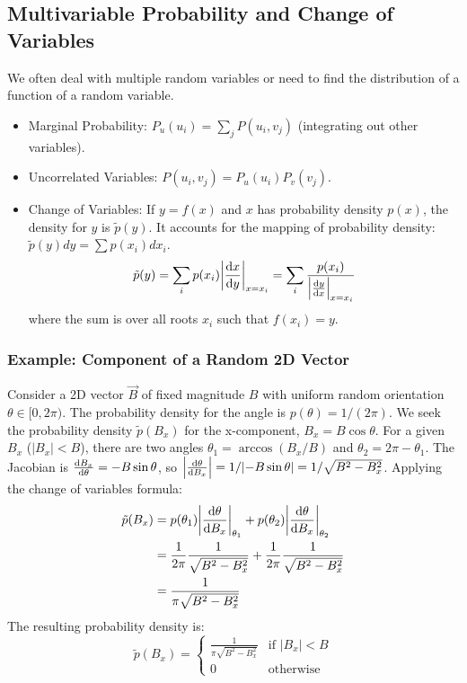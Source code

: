 \documentclass[10pt, letterpaper]{article}
\begin{document}
\subsection{Multivariable Probability and Change of Variables}
We often deal with multiple random variables or need to find the distribution of a function of a random variable.
\begin{itemize}
    \item Marginal Probability: $P_u(u_i) = \sum_j P(u_i, v_j)$ (integrating out other variables).
    \item Uncorrelated Variables: $P(u_i, v_j) = P_u(u_i) P_v(v_j)$.
    \item Change of Variables: If $y = f(x)$ and $x$ has probability density $p(x)$, the density for $y$ is $\tilde{p}(y)$. It accounts for the mapping of probability density: $\tilde{p}(y) dy = \sum p(x_i) dx_i$.
        \begin{equation}
           \tilde{p}(y) = \sum_i p(x_i) \abs{\dv{x}{y}}_{x=x_i} = \sum_i \frac{p(x_i)}{\abs{\dv{y}{x}}_{x=x_i}}
        \end{equation}
        where the sum is over all roots $x_i$ such that $f(x_i) = y$.
\end{itemize}

\subsubsection*{Example: Component of a Random 2D Vector}
Consider a 2D vector $\vec{B}$ of fixed magnitude $B$ with uniform random orientation $\theta \in [0, 2\pi)$. The probability density for the angle is $p(\theta)=1/(2\pi)$. We seek the probability density $\tilde{p}(B_x)$ for the x-component, $B_x = B \cos\theta$.
For a given $B_x$ ($|B_x|<B$), there are two angles $\theta_1 = \arccos(B_x/B)$ and $\theta_2 = 2\pi - \theta_1$.
The Jacobian is $\dv{B_x}{\theta} = -B \sin\theta$, so $\abs{\dv{\theta}{B_x}} = 1/\abs{-B \sin\theta} = 1/\sqrt{B^2 - B_x^2}$.
Applying the change of variables formula:
\begin{align}
    \tilde{p}(B_x) &= p(\theta_1) \abs{\dv{\theta}{B_x}}_{\theta_1} + p(\theta_2) \abs{\dv{\theta}{B_x}}_{\theta_2} \\
                   &= \frac{1}{2\pi} \frac{1}{\sqrt{B^2 - B_x^2}} + \frac{1}{2\pi} \frac{1}{\sqrt{B^2 - B_x^2}} \\
                   &= \frac{1}{\pi \sqrt{B^2 - B_x^2}}
\end{align}
The resulting probability density is:
\begin{equation}
    \tilde{p}(B_x) = \begin{cases} \frac{1}{\pi \sqrt{B^2 - B_x^2}} & \text{if } |B_x| < B \\ 0 & \text{otherwise} \end{cases}
\end{equation}
\end{document}

